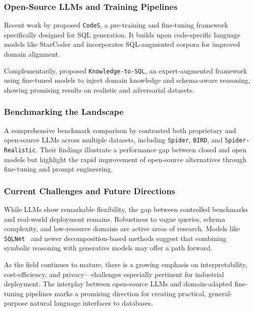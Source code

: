\subsubsection{Open-Source LLMs and Training Pipelines}

Recent work by \citet{li2024codes} proposed \texttt{CodeS}, a pre-training and fine-tuning framework specifically designed for SQL generation. It builds upon code-specific language models like StarCoder and incorporates SQL-augmented corpora for improved domain alignment.

Complementarily, \citet{hong2024knowledge} proposed \texttt{Knowledge-to-SQL}, an expert-augmented framework using fine-tuned models to inject domain knowledge and schema-aware reasoning, showing promising results on realistic and adversarial datasets.

\subsubsection{Benchmarking the Landscape}

A comprehensive benchmark comparison by \citet{gao2024benchmark} contrasted both proprietary and open-source LLMs across multiple datasets, including \texttt{Spider}, \texttt{BIRD}, and \texttt{Spider-Realistic}. Their findings illustrate a performance gap between closed and open models but highlight the rapid improvement of open-source alternatives through fine-tuning and prompt engineering.

\subsubsection{Current Challenges and Future Directions}

While LLMs show remarkable flexibility, the gap between controlled benchmarks and real-world deployment remains. Robustness to vague queries, schema complexity, and low-resource domains are active areas of research. Models like \texttt{SQLNet}~\cite{xu2017sqlnet} and newer decomposition-based methods suggest that combining symbolic reasoning with generative models may offer a path forward.

As the field continues to mature, there is a growing emphasis on interpretability, cost-efficiency, and privacy---challenges especially pertinent for industrial deployment. The interplay between open-source LLMs and domain-adapted fine-tuning pipelines marks a promising direction for creating practical, general-purpose natural language interfaces to databases.


